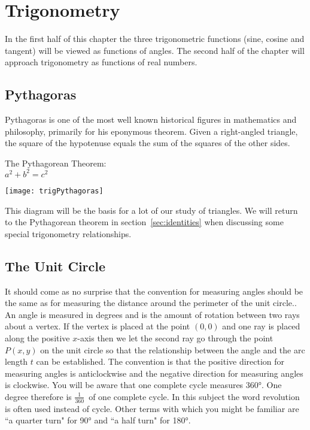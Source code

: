 \chapter{Trigonometry}
In the first half of this chapter the three trigonometric functions (sine, cosine and tangent) will be viewed as functions of angles. The second half of the chapter will approach trigonometry as functions of real numbers.
\section*{Pythagoras}
Pythagoras is one of the most well known historical figures in mathematics and philosophy, primarily for his eponymous theorem. Given a right-angled triangle, the square of the hypotenuse equals the sum of the squares of the other sides.
\begin{tcolorbox}[colback=white]
	\begin{multicols}{2}
		\begin{center}
			The Pythagorean Theorem:\\
			
			\vspace{1cm}$a^2+b^2=c^2$
		\end{center}
\columnbreak
\begin{center}
	\texttt{[image: trigPythagoras]}
\end{center}
	\end{multicols}
\end{tcolorbox}
This diagram will be the basis for a lot of our study of triangles. We will return to the Pythagorean theorem in section~\ref{sec:identities} when discussing some special trigonometry relationships.
\section{The Unit Circle}
It should come as no surprise that the convention for measuring angles should be the same as for measuring
the distance around the perimeter of the unit circle.. An angle is measured in degrees and is the amount of
rotation between two rays about a vertex. If the vertex is placed at the point $\left (0 ,0\right )$ and one ray is placed along the positive $x$-axis then we let the second ray go through the point $P (x ,y)$ on the unit circle so that the relationship between the angle and the arc length $t$ can be established. The convention is that the positive direction for measuring
angles is anticlockwise and the negative direction for measuring angles is clockwise. You will be aware that one complete cycle measures \ang{360}. One degree therefore is $\frac{1}{360}$\ of one complete cycle. In this subject the word revolution is often used instead of cycle. Other terms with which you might be familiar are ``a quarter turn" for \ang{90} and ``a half turn" for \ang{180}. 

